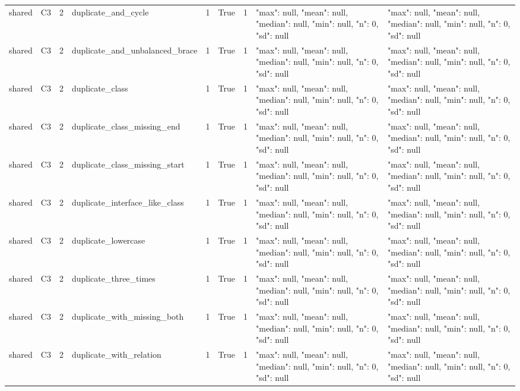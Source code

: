 \begin{tabular}{lllllllll}
shared & C3 & 2 & duplicate\_and\_cycle & 1 & True & 1 & {"max": null, "mean": null, "median": null, "min": null, "n": 0, "sd": null} & {"max": null, "mean": null, "median": null, "min": null, "n": 0, "sd": null} \\
shared & C3 & 2 & duplicate\_and\_unbalanced\_brace & 1 & True & 1 & {"max": null, "mean": null, "median": null, "min": null, "n": 0, "sd": null} & {"max": null, "mean": null, "median": null, "min": null, "n": 0, "sd": null} \\
shared & C3 & 2 & duplicate\_class & 1 & True & 1 & {"max": null, "mean": null, "median": null, "min": null, "n": 0, "sd": null} & {"max": null, "mean": null, "median": null, "min": null, "n": 0, "sd": null} \\
shared & C3 & 2 & duplicate\_class\_missing\_end & 1 & True & 1 & {"max": null, "mean": null, "median": null, "min": null, "n": 0, "sd": null} & {"max": null, "mean": null, "median": null, "min": null, "n": 0, "sd": null} \\
shared & C3 & 2 & duplicate\_class\_missing\_start & 1 & True & 1 & {"max": null, "mean": null, "median": null, "min": null, "n": 0, "sd": null} & {"max": null, "mean": null, "median": null, "min": null, "n": 0, "sd": null} \\
shared & C3 & 2 & duplicate\_interface\_like\_class & 1 & True & 1 & {"max": null, "mean": null, "median": null, "min": null, "n": 0, "sd": null} & {"max": null, "mean": null, "median": null, "min": null, "n": 0, "sd": null} \\
shared & C3 & 2 & duplicate\_lowercase & 1 & True & 1 & {"max": null, "mean": null, "median": null, "min": null, "n": 0, "sd": null} & {"max": null, "mean": null, "median": null, "min": null, "n": 0, "sd": null} \\
shared & C3 & 2 & duplicate\_three\_times & 1 & True & 1 & {"max": null, "mean": null, "median": null, "min": null, "n": 0, "sd": null} & {"max": null, "mean": null, "median": null, "min": null, "n": 0, "sd": null} \\
shared & C3 & 2 & duplicate\_with\_missing\_both & 1 & True & 1 & {"max": null, "mean": null, "median": null, "min": null, "n": 0, "sd": null} & {"max": null, "mean": null, "median": null, "min": null, "n": 0, "sd": null} \\
shared & C3 & 2 & duplicate\_with\_relation & 1 & True & 1 & {"max": null, "mean": null, "median": null, "min": null, "n": 0, "sd": null} & {"max": null, "mean": null, "median": null, "min": null, "n": 0, "sd": null} \\

\end{tabular}
